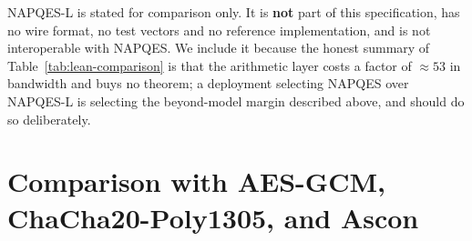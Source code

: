 \documentclass[11pt,a4paper]{article}
\begin{document}
NAPQES-L is stated for comparison only. It is \textbf{not} part of this
specification, has no wire format, no test vectors and no reference
implementation, and is not interoperable with NAPQES. We include it because
the honest summary of Table~\ref{tab:lean-comparison} is that the
arithmetic layer costs a factor of ${\approx}53$ in bandwidth and buys no
theorem; a deployment selecting NAPQES over NAPQES-L is selecting the
beyond-model margin described above, and should do so deliberately.

\section{Comparison with AES-GCM, ChaCha20-Poly1305, and Ascon}
\label{sec:comparison}

\begin{table}[h]
\centering
{}
\caption{Comparison of NAPQES with established AEAD schemes. The two FIPS
rows are distinct and must not be conflated: NAPQES uses only an approved
primitive (HMAC-SHA256, FIPS 198-1/180-4), but NAPQES \emph{itself} is not
an approved algorithm or mode. In a FIPS 140-3 validation it would fall
outside the approved-mode boundary and would be reported as a
non-approved algorithm, notwithstanding the provenance of its primitive.}
\label{tab:comparison}
\end{table}
\end{document}
